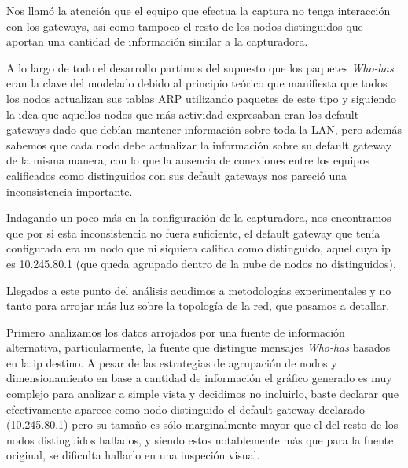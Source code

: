 Nos llamó la atención que el equipo que efectua la captura no tenga interacción con los gateways, asi como tampoco el resto de los nodos distinguidos que aportan una cantidad de información similar a la capturadora. 

A lo largo de todo el desarrollo partimos del supuesto que los paquetes \textit{Who-has} eran la clave del modelado debido al principio teórico que manifiesta que todos los nodos actualizan sus tablas ARP utilizando paquetes de este tipo y siguiendo la idea que aquellos nodos que más actividad expresaban eran los default gateways dado que debían mantener información sobre toda la LAN, pero además sabemos que cada nodo debe actualizar la información sobre su default gateway de la misma manera, con lo que la ausencia de conexiones entre los equipos calificados como distinguidos con sus default gateways nos pareció una inconsistencia importante.

Indagando un poco más en la configuración de la capturadora, nos encontramos que por si esta inconsistencia no fuera suficiente, el default gateway que tenía configurada era un nodo que ni siquiera califica como distinguido, aquel cuya ip es 10.245.80.1 (que queda agrupado dentro de la nube de nodos no distinguidos). 

Llegados a este punto del análisis acudimos a metodologías experimentales y no tanto para arrojar más luz sobre la topología de la red, que pasamos a detallar.

Primero analizamos los datos arrojados por una fuente de información alternativa, particularmente, la fuente que distingue mensajes \textit{Who-has} basados en la ip destino. A pesar de las estrategias de agrupación de nodos y dimensionamiento en base a cantidad de información el gráfico generado es muy complejo para analizar a simple vista y decidimos no incluirlo, baste declarar que efectivamente aparece como nodo distinguido el default gateway declarado (10.245.80.1) pero su tamaño es sólo marginalmente mayor que el del resto de los nodos distinguidos hallados, y siendo estos notablemente más que para la fuente original, se dificulta hallarlo en una inspeción visual.\\

